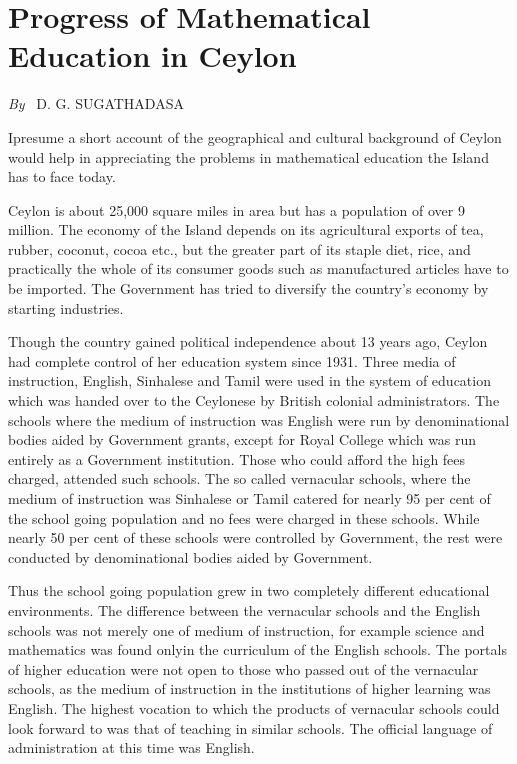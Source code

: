 \chapter{Progress of Mathematical Education in Ceylon}

\begin{center}
{\em By}~ D. G. SUGATHADASA
\end{center}

\setcounter{pageoriginal}{164}
I\pageoriginale presume a short account of the geographical and cultural background of Ceylon would help in appreciating the problems in mathematical education the Island has to face today.

Ceylon is about 25,000 square miles in area but has a population of over 9 million. The economy of the Island depends on its agricultural exports of tea, rubber, coconut, cocoa etc., but the greater part of its staple diet, rice, and practically the whole of its consumer goods such as manufactured articles have to be imported. The Government has tried to diversify the country's economy by starting industries.

Though the country gained political independence about 13 years ago, Ceylon had complete control of her education system since 1931. Three media of instruction, English, Sinhalese and Tamil were used in the system of education which was handed over to the Ceylonese by British colonial administrators. The schools where the medium of instruction was English were run by denominational bodies aided by Government grants, except for Royal College which was run entirely as a Government institution. Those who could afford the high fees charged, attended such schools. The so called vernacular schools, where the medium of instruction was Sinhalese or Tamil catered for nearly 95 per cent of the school going population and no fees were charged in these schools. While nearly 50 per cent of these schools were controlled by Government, the rest were conducted by denominational bodies aided by Government.

Thus the school going population grew in two completely different educational environments. The difference between the vernacular schools and the English schools was not merely one of medium of instruction, for example science and mathematics was found only\pageoriginale in the curriculum of the English schools. The portals of higher education were not open to those who passed out of the vernacular schools, as the medium of instruction in the institutions of higher learning was English. The highest vocation to which the products of vernacular schools could look forward to was that of teaching in similar schools. The official language of administration at this time was English.

